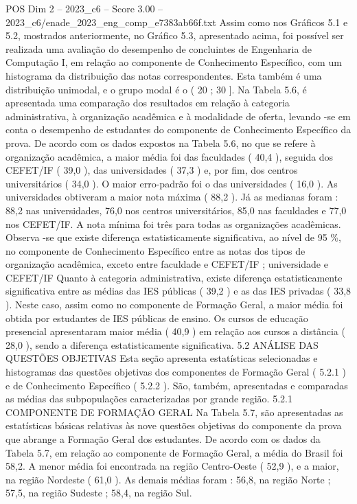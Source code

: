 \begin{textsample}{POS Dim 2 – 2023\_c6 – Score 3.00 – 2023\_c6/enade\_2023\_eng\_comp\_e7383ab66f.txt}
Assim como nos Gráficos 5.1 e 5.2, mostrados anteriormente, no Gráfico 5.3, apresentado acima, foi possível ser realizada uma avaliação do desempenho de concluintes de Engenharia de Computação I, em relação ao componente de Conhecimento Específico, com um histograma da distribuição das notas correspondentes.
Esta também é uma distribuição unimodal, e o grupo modal é o ( 20 ; 30 ].
Na Tabela 5.6, é apresentada uma comparação dos resultados em relação à categoria administrativa, à organização acadêmica e à modalidade de oferta, levando -se em conta o desempenho de estudantes do componente de Conhecimento Específico da prova.
De acordo com os dados expostos na Tabela 5.6, no que se refere à organização acadêmica, a maior média foi das faculdades ( 40,4 ), seguida dos CEFET/IF ( 39,0 ), das universidades ( 37,3 ) e, por fim, dos centros universitários ( 34,0 ).
O maior erro-padrão foi o das universidades ( 16,0 ).
As universidades obtiveram a maior nota máxima ( 88,2 ).
Já as medianas foram : 88,2 nas universidades, 76,0 nos centros universitários, 85,0 nas faculdades e 77,0 nos CEFET/IF.
A nota mínima foi três para todas as organizações acadêmicas.
Observa -se que existe diferença estatisticamente significativa, ao nível de 95 \%, no componente de Conhecimento Específico entre as notas dos tipos de organização acadêmica, exceto entre faculdade e CEFET/IF ; universidade e CEFET/IF Quanto à categoria administrativa, existe diferença estatisticamente significativa entre as médias das IES públicas ( 39,2 ) e as das IES privadas ( 33,8 ).
Neste caso, assim como no componente de Formação Geral, a maior média foi obtida por estudantes de IES públicas de ensino.
Os cursos de educação presencial apresentaram maior média ( 40,9 ) em relação aos cursos a distância ( 28,0 ), sendo a diferença estatisticamente significativa. 5.2 ANÁLISE DAS QUESTÕES OBJETIVAS Esta seção apresenta estatísticas selecionadas e histogramas das questões objetivas dos componentes de Formação Geral ( 5.2.1 ) e de Conhecimento Específico ( 5.2.2 ).
São, também, apresentadas e comparadas as médias das subpopulações caracterizadas por grande região. 5.2.1 COMPONENTE DE FORMAÇÃO GERAL Na Tabela 5.7, são apresentadas as estatísticas básicas relativas às nove questões objetivas do componente da prova que abrange a Formação Geral dos estudantes.
De acordo com os dados da Tabela 5.7, em relação ao componente de Formação Geral, a média do Brasil foi 58,2.
A menor média foi encontrada na região Centro-Oeste ( 52,9 ), e a maior, na região Nordeste ( 61,0 ).
As demais médias foram : 56,8, na região Norte ; 57,5, na região Sudeste ; 58,4, na região Sul.

\end{textsample}
